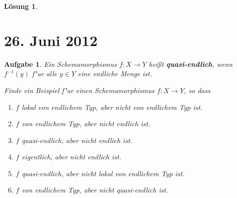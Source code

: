 \documentclass[paper = A4, fontsize=12pt, numbers=noendperiod, chapterprefix=true]{scrbook}
\theoremstyle{break}
\newtheorem{Aufg}{Aufgabe}
\newtheorem{Loes}{L\"osung}
\theoremstyle{nonumberbreak}
\theoremstyle{nonumberplain}
\begin{document}
\begin{Loes}

\end{Loes}

\newpage
\section{26. Juni 2012}
\setcounter{Aufg}{0}
\setcounter{Loes}{0}

\begin{Aufg}
Ein Schemamorphismus $f\colon X\to Y$ hei\ss t \textbf{quasi-endlich}, wenn $f^{-1}(y)$ f"ur alle $y\in Y$ eine endliche Menge ist.

Finde ein Beispiel f"ur einen Schemamorphismus $f\colon X\to Y$, so dass
\begin{enumerate}%
 \item $f$ lokal von endlichem Typ, aber nicht von endlichem Typ ist.
 \item $f$ von endlichem Typ, aber nicht endlich ist.
 \item $f$ quasi-endlich, aber nicht endlich ist.
 \item $f$ eigentlich, aber nicht endlich ist.
 \item $f$ quasi-endlich, aber nicht lokal von endlichem Typ ist.
 \item $f$ von endlichem Typ, aber nicht quasi-endlich ist.
\end{enumerate}
\end{Aufg}
\end{document}
